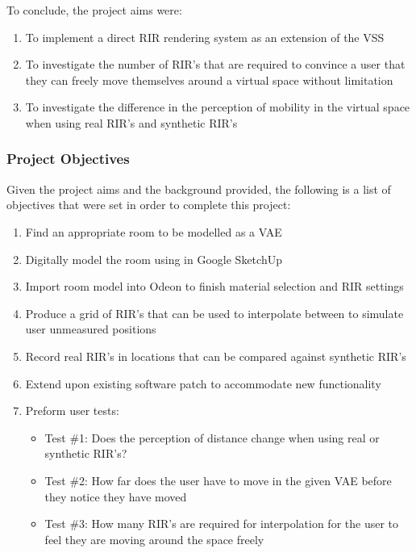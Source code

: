 \documentclass[../../main.tex]{subfiles}
\begin{document}
		To conclude, the project aims were:

		\begin{enumerate}
			\item To implement a direct \ac{RIR} rendering system as an extension of the \ac{VSS}

			\item To investigate the number of \ac{RIR}'s that are required to convince a user that they can freely move themselves around a virtual space without limitation

			\item To investigate the difference in the perception of mobility in the virtual space when using real \ac{RIR}'s and synthetic \ac{RIR}'s
		\end{enumerate}

	\subsubsection{Project Objectives}
	\label{background:objectives}

		Given the project aims and the background provided, the following is a list of objectives that were set in order to complete this project:

		\begin{enumerate}
			\item Find an appropriate room to be modelled as a \ac{VAE} 
			\item Digitally model the room using in Google SketchUp
			\item Import room model into Odeon to finish material selection and \ac{RIR} settings
			\item Produce a grid of \ac{RIR}'s that can be used to interpolate between to simulate user unmeasured positions
			\item Record real \ac{RIR}'s in locations that can be compared against synthetic \ac{RIR}'s
			\item Extend upon existing software patch to accommodate new functionality
			\item Preform user tests:
				\begin{itemize}
					\item Test \#1: Does the perception of distance change when using real or synthetic \ac{RIR}'s?
					\item Test \#2: How far does the user have to move in the given \ac{VAE} before they notice they have moved 
					\item Test \#3: How many \ac{RIR}'s are required for interpolation for the user to feel they are moving around the space freely
				\end{itemize}
			\end{enumerate}
\end{document}
